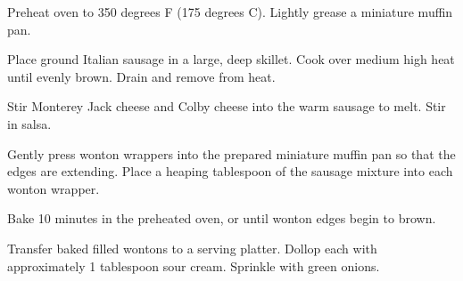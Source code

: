 
\info[servings=24,
		time = 35,
		source = mom]{}


\begin{ingredientsh}
\end{ingredientsh}


\begin{preparation}
	\step Preheat oven to 350 degrees F (175 degrees C). Lightly grease a miniature muffin pan.
	
	\step Place ground Italian sausage in a large, deep skillet. Cook over medium high heat until evenly brown. Drain and remove from heat.
	
	\step Stir Monterey Jack cheese and Colby cheese into the warm sausage to melt. Stir in salsa.
	
	\step Gently press wonton wrappers into the prepared miniature muffin pan so that the edges are extending. Place a heaping tablespoon of the sausage mixture into each wonton wrapper.
	
	\step Bake 10 minutes in the preheated oven, or until wonton edges begin to brown.
	
	\step Transfer baked filled wontons to a serving platter. Dollop each with approximately 1 tablespoon sour cream. Sprinkle with green onions.
\end{preparation}

\begin{notes}
\end{notes}

